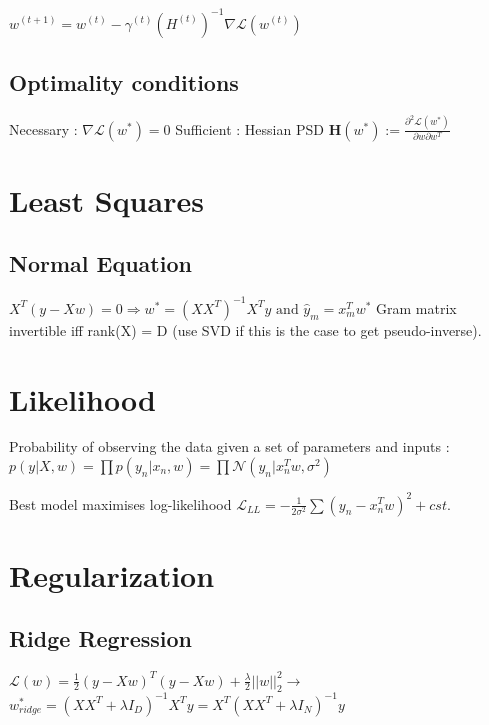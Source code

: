 $w^{(t+1)} = w^{(t)} - \gamma^{(t)} (H^{(t)})^{-1} \nabla \mathcal{L}(w^{(t)})$


\subsection{Optimality conditions}
Necessary : $\nabla \mathcal{L} (w^*) = 0$
Sufficient : Hessian PSD $\mathbf{H}(w^*) := \frac{\partial^2 \mathcal{L}(w^*)}{\partial w \partial w^T}$


\section{Least Squares}
\subsection{Normal Equation}
$X^T (y - Xw)= 0 \Rightarrow w^* = (XX^T)^{-1}X^Ty \text{ and } \hat{y}_m = x_m^T w^*$
Gram matrix invertible iff rank(X) = D (use SVD if this is the case to get pseudo-inverse).

\section{Likelihood}
Probability of observing the data given a set of parameters and inputs :
$p(y|X,w) = \prod p(y_n|x_n, w) = \prod \mathcal{N}(y_n | x_n^Tw, \sigma^2)$

Best model maximises log-likelihood $\mathcal{L}_{LL} = -\frac{1}{2\sigma^2} \sum(y_n-x_n^Tw)^2+cst$.


\section{Regularization}
\subsection{Ridge Regression}
$\mathcal{L}(w) = \frac{1}{2} (y - Xw)^T(y - Xw) + \frac{\lambda}{2} ||w||^2_2 \rightarrow$
$w^*_{ridge} = (XX^T + \lambda I_D)^{-1}X^Ty = X^T(XX^T + \lambda I_N)^{-1}y$

